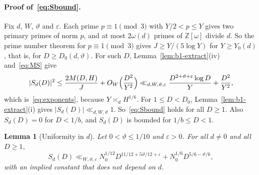 \documentclass[11pt]{article}
\numberwithin{equation}{section}
\newcommand{\OO}{\mathbb Z[\omega]}
\newtheorem{lemma}{Lemma}
\begin{document}
\paragraph{Proof of~\eqref{eq:Sbound}.} Fix $d$, $W$, $\vartheta$ and $\varepsilon$. Each prime $p\equiv1\pmod3$ with
$Y/2<p\le Y$ gives two primary primes of norm $p$, and at most $2\omega(d)$ primes of $\OO$ divide $d$. So the prime
number theorem for $p\equiv1\pmod 3$ gives $J\ge Y/(5\log Y)$ for $Y\ge Y_0(d)$, that is, for $D\ge D_0(d,\vartheta)$.
For such $D$, Lemma~\ref{lem:b1-extract}(iv) and~\eqref{eq:MS} give
\begin{equation}\label{eq:d024}
 |S_d(D)|^2\le\frac{2M(D,H)}J+O_W\Bigl(\frac{D^2}{Y^2}\Bigr)
 \ll_{d,W,\vartheta,\varepsilon}\frac{D^{2+\vartheta+\varepsilon}\log D}{Y}+\frac{D^2}{Y^2},
\end{equation}
which is~\eqref{eq:exponents}, because $Y\asymp_dH^{1/6}$. For $1\le D<D_0$, Lemma~\ref{lem:b1-extract}(i) gives
$|S_d(D)|\ll_{d,W,\vartheta}1$. So~\eqref{eq:Sbound} holds for all $D\ge1$. Also $S_d(D)=0$ for $D<1/b$, and
$S_d(D)$ is bounded for $1/b\le D<1$.

\begin{lemma}[Uniformity in $d$]\label{lem:b1-uniform}
Let $0<\vartheta\le1/10$ and $\varepsilon>0$. For all $d\ne0$ and all $D\ge1$,
\begin{equation}\label{eq:d025}
 S_d(D)\ll_{W,\vartheta,\varepsilon}N_0^{1/12}D^{11/12+5\vartheta/12+\varepsilon}+N_0^{1/6}D^{5/6-\vartheta/6},
\end{equation}
with an implied constant that does not depend on $d$.
\end{lemma}
\end{document}
